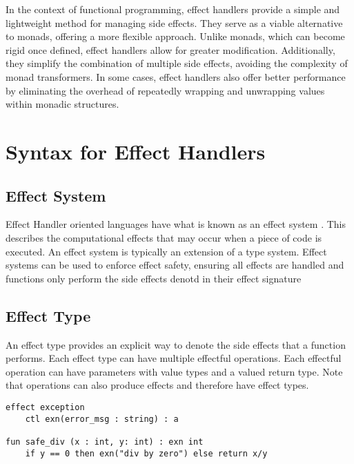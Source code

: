 \documentclass[logo,bsc,singlespacing,parskip]{infthesis}
\begin{document}
In the context of functional programming, effect handlers provide a simple and lightweight method for managing side effects. They serve as a viable alternative to monads, offering a more flexible approach. Unlike monads, which can become rigid once defined, effect handlers allow for greater modification. Additionally, they simplify the combination of multiple side effects, avoiding the complexity of monad transformers. In some cases, effect handlers also offer better performance by eliminating the overhead of repeatedly wrapping and unwrapping values within monadic structures. 


\section{Syntax for Effect Handlers}

\subsection{Effect System}
Effect Handler oriented languages have what is known as an effect system \cite{bauer_effect_2013}. This describes the computational effects that may occur when a piece of code is executed. An effect system is typically an extension of a type system. Effect systems can be used to enforce effect safety, ensuring all effects are handled and functions only perform the side effects denotd in their effect signature







\subsection{Effect Type}
An effect type provides an explicit way to denote the side effects that a function performs. Each effect type can have multiple effectful operations. Each effectful operation can have parameters with value types and a valued return type. Note that operations can also produce effects and therefore have effect types.

\begin{lstlisting}
effect exception
    ctl exn(error_msg : string) : a 

fun safe_div (x : int, y: int) : exn int
    if y == 0 then exn("div by zero") else return x/y
\end{lstlisting}
\end{document}
